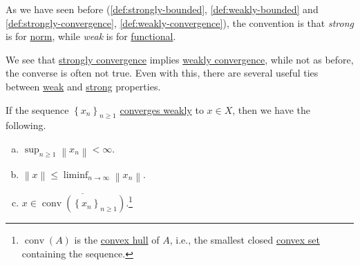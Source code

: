 \begin{remark}
	As we have seen before (\autoref{def:strongly-bounded}, \autoref{def:weakly-bounded} and \autoref{def:strongly-convergence}, \autoref{def:weakly-convergence}), the convention is that \emph{strong} is for \hyperref[def:norm]{norm}, while \emph{weak} is for \hyperref[def:linear-functional]{functional}.
\end{remark}

We see that \hyperref[def:strongly-convergence]{strongly convergence} implies \hyperref[def:weakly-convergence]{weakly convergence}, while not as before, the converse is often not true. Even with this, there are several useful ties between \hyperref[def:weakly-convergence]{weak} and \hyperref[def:strongly-convergence]{strong} properties.

\begin{proposition}\label{prop:lec16}
	If the sequence \(\left\{ x_n \right\} _{n\geq 1}\) \hyperref[def:weakly-convergence]{converges weakly} to \(x\in X\), then we have the following.
	\begin{enumerate}[(a)]
		\item \(\sup _{n \geq 1} \left\lVert x_n\right\rVert < \infty \).
		\item \(\left\lVert x\right\rVert \leq \liminf_{n \to \infty} \left\lVert x_n\right\rVert \).
		\item \(x\in \overline{\operatorname{conv}(\left\{ x_n \right\}_{n\geq 1})}\).\footnote{\(\operatorname{conv}(A)\) is the \href{https://en.wikipedia.org/wiki/Convex_hull}{convex hull} of \(A\), i.e., the smallest closed \hyperref[def:convex-set]{convex set} containing the sequence.}
	\end{enumerate}
\end{proposition}
